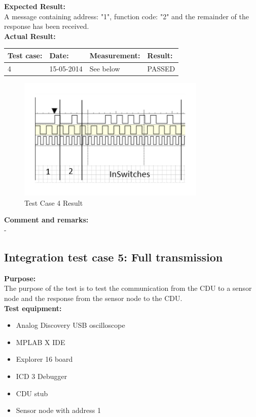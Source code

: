\textbf{Expected Result:}\\
A message containing address: "1", function code: "2" and the remainder of the response has been received.\\

\textbf{Actual Result:}\\
\begin{table}[H]
\centering
\begin{tabular}{|p{2cm}|p{2cm}|p{3cm}|p{2cm}|}\hline
\textbf{Test case:} & \textbf{Date:} & \textbf{Measurement:} & \textbf{Result:} \\ \hline
4 & 15-05-2014 & See below & PASSED \\ \hline
\end{tabular}
\end{table}

\begin{figure}[H]
\centering
\includegraphics[width=0.8\textwidth]{billeder/intetestcase4}
\caption{Test Case 4 Result}
\label{fig:InteTestCase4}
\end{figure}


\textbf{Comment and remarks:}\\
-\\
\subsection{Integration test case 5: Full transmission}
\textbf{Purpose:}\\
The purpose of the test is to test the communication from the CDU to a sensor node and the response from the sensor node to the CDU.\\

\textbf{Test equipment:}
\begin{itemize}
\item Analog Discovery USB oscilloscope
\item MPLAB X IDE
\item Explorer 16 board
\item ICD 3 Debugger
\item CDU stub
\item Sensor node with address 1
\end{itemize}

